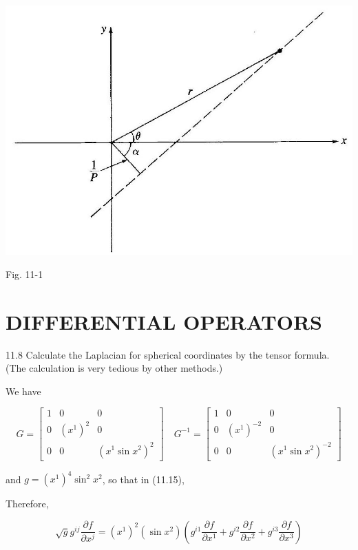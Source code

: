 \documentclass[10pt]{article}
\begin{document}
\begin{center}
\includegraphics[max width=\textwidth]{2024_04_03_41f90be4f896e21f0dc9g-169}
\end{center}

Fig. 11-1

\section*{DIFFERENTIAL OPERATORS}
11.8 Calculate the Laplacian for spherical coordinates by the tensor formula. (The calculation is very tedious by other methods.)

We have

$$
G=\left[\begin{array}{ccc}
1 & 0 & 0 \\
0 & \left(x^{1}\right)^{2} & 0 \\
0 & 0 & \left(x^{1} \sin x^{2}\right)^{2}
\end{array}\right] \quad G^{-1}=\left[\begin{array}{ccc}
1 & 0 & 0 \\
0 & \left(x^{1}\right)^{-2} & 0 \\
0 & 0 & \left(x^{1} \sin x^{2}\right)^{-2}
\end{array}\right]
$$

and $g=\left(x^{1}\right)^{4} \sin ^{2} x^{2}$, so that in (11.15),

Therefore,

$$
\sqrt{g} g^{i j} \frac{\partial f}{\partial x^{j}}=\left(x^{1}\right)^{2}\left(\sin x^{2}\right)\left(g^{i 1} \frac{\partial f}{\partial x^{1}}+g^{i 2} \frac{\partial f}{\partial x^{2}}+g^{i 3} \frac{\partial f}{\partial x^{3}}\right)
$$
\end{document}
